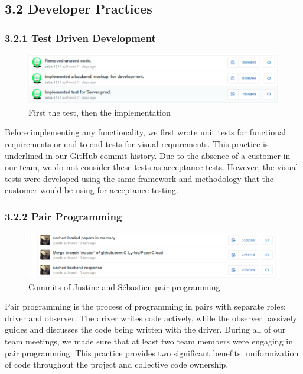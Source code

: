 \documentclass[]{article}
\begin{document}
\subsection{3.2 Developer Practices}\label{developer-practices}

\subsubsection{3.2.1 Test Driven
Development}\label{test-driven-development}

\begin{figure}[htbp]
\centering
\includegraphics{images/test_driven.png}
\caption{First the test, then the implementation}
\end{figure}

Before implementing any functionality, we first wrote unit tests for
functional requirements or end-to-end tests for visual requirements.
This practice is underlined in our GitHub commit history. Due to the
absence of a customer in our team, we do not consider these tests as
acceptance tests. However, the visual tests were developed using the
same framework and methodology that the customer would be using for
acceptance testing.


\subsubsection{3.2.2 Pair Programming}\label{pair-programming}

\begin{figure}[htbp]
\centering
\includegraphics{images/justine_pair.png}
\caption{Commits of Justine and Sébastien pair programming}
\end{figure}

Pair programming is the process of programming in pairs with separate
roles: driver and observer. The driver writes code actively, while the
observer passively guides and discusses the code being written with the
driver. During all of our team meetings, we made sure that at least two
team members were engaging in pair programming. This practice provides
two significant benefits: uniformization of code throughout the project
and collective code ownership.
\end{document}

